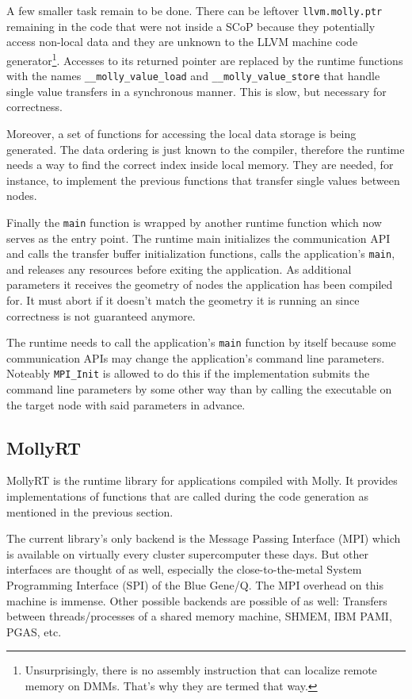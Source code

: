 \documentclass{sigplanconf}
\begin{document}
A few smaller task remain to be done. There can be leftover \texttt{llvm.molly.ptr} remaining in the code that were not inside a SCoP because they potentially access non-local data and they are unknown to the LLVM machine code generator\footnote{Unsurprisingly, there is no assembly instruction that can localize remote memory on DMMs. That's why they are termed that way.}. Accesses to its returned pointer are replaced by the runtime functions with the names \texttt{\_\_molly\_value\_load} and \texttt{\_\_molly\_value\_store} that handle single value transfers in a synchronous manner. This is slow, but necessary for correctness.

Moreover, a set of functions for accessing the local data storage is being generated. The data ordering is just known to the compiler, therefore the runtime needs a way to find the correct index inside local memory. They are needed, for instance, to implement the previous functions that transfer single values between nodes.

Finally the \texttt{main} function is wrapped by another runtime function which now serves as the entry point. The runtime main initializes the communication API and calls the transfer buffer initialization functions, calls the application's \texttt{main}, and releases any resources before exiting the application. As additional parameters it receives the geometry of nodes the application has been compiled for. It must abort if it doesn't match the geometry it is running an since correctness is not guaranteed anymore.

The runtime needs to call the application's \texttt{main} function by itself because some communication APIs may change the application's command line parameters. Noteably \texttt{MPI\_Init} is allowed to do this if the implementation submits the command line parameters by some other way than by calling the executable on the target node with said parameters in advance.


\subsection{MollyRT}

MollyRT is the runtime library for applications compiled with Molly. It provides implementations of functions that are called during the code generation as mentioned in the previous section.

The current library's only backend is the Message Passing Interface (MPI) which is available on virtually every cluster supercomputer these days. But other interfaces are thought of as well, especially the close-to-the-metal System Programming Interface (SPI) of the Blue Gene/Q. The MPI overhead on this machine is immense. Other possible backends are possible of as well: Transfers between threads/processes of a shared memory machine, SHMEM, IBM PAMI, PGAS, etc.
\end{document}
